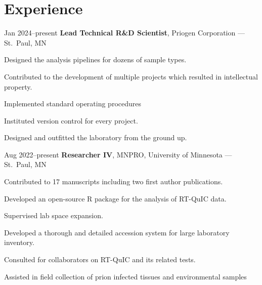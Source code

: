 \documentclass{resume}
\begin{document}
    \section{Experience}
        \begin{twocolentry}{Jan 2024--present}
            \textbf{Lead Technical R\&D Scientist}, Priogen Corporation --- St.\ Paul, MN
        \end{twocolentry}
        \vspace{0.10 cm}
        \begin{onecolentry}
            \begin{highlights}
                \item Designed the analysis pipelines for dozens of sample types.
                \item Contributed to the development of multiple projects which resulted in intellectual property.
                \item Implemented standard operating procedures
                \item Instituted version control for every project.
                \item Designed and outfitted the laboratory from the ground up.
            \end{highlights}
        \end{onecolentry}
        \vspace{0.2 cm}

        \begin{twocolentry}{Aug 2022--present}
            \textbf{Researcher IV}, MNPRO, University of Minnesota --- St.\ Paul, MN
        \end{twocolentry}
        \vspace{0.10 cm}
        \begin{onecolentry}
            \begin{highlights}
                \item Contributed to 17 manuscripts including two first author publications.
                \item Developed an open-source R package for the analysis of RT-QuIC data.
                \item Supervised lab space expansion.
                \item Developed a thorough and detailed accession system for large laboratory inventory.
                \item Consulted for collaborators on RT-QuIC and its related tests.
                \item Assisted in field collection of prion infected tissues and environmental samples
            \end{highlights}
        \end{onecolentry}
        \vspace{0.2cm}
\end{document}
